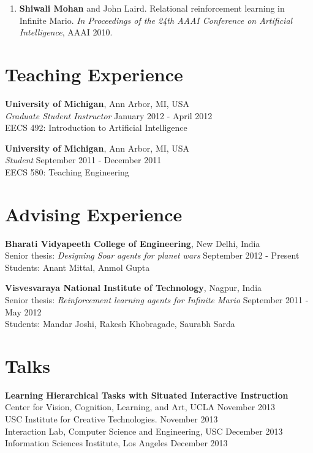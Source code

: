 \documentclass[margin,line,11pt]{res}
\begin{document}
\begin{resume}
\begin{enumerate}[label=\lbrack A\arabic*\rbrack,leftmargin=*]
\item \textbf{Shiwali Mohan} and John Laird. Relational reinforcement learning in Infinite Mario. \emph{In Proceedings of the
24th AAAI Conference on Artificial Intelligence}, AAAI 2010.
\end{enumerate}

\section{\sc Teaching Experience}
\textbf{University of Michigan}, Ann Arbor, MI, USA \\
\emph{Graduate Student Instructor} \hfill January 2012 - April 2012 \\
EECS 492: Introduction to Artificial Intelligence

\textbf{University of Michigan}, Ann Arbor, MI, USA \\
\emph{Student}  \hfill September 2011 - December 2011\\
EECS 580: Teaching Engineering

\section{\sc Advising Experience}
\textbf{Bharati Vidyapeeth College of Engineering}, New Delhi, India\\
Senior thesis: \emph{Designing Soar agents for planet wars} \hfill September 2012 - Present\\
Students: Anant Mittal, Anmol Gupta

\textbf{Visvesvaraya National Institute of Technology}, Nagpur, India\\
Senior thesis: \emph{Reinforcement learning agents for Infinite Mario} \hfill September 2011 - May 2012\\
Students: Mandar Joshi, Rakesh Khobragade, Saurabh Sarda\\

\section{\sc Talks}
\textbf{Learning Hierarchical Tasks with Situated Interactive Instruction}\\
Center for Vision, Cognition, Learning, and Art, UCLA \hfill November 2013\\
USC Institute for Creative Technologies. \hfill November 2013\\
Interaction Lab, Computer Science and Engineering, USC \hfill December 2013\\
Information Sciences Institute, Los Angeles \hfill December 2013


\end{resume}
\end{document}
